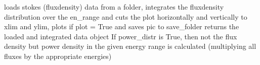 \documentclass[letterpaper,10pt,english]{sphinxmanual}
\begin{document}
\begin{fulllineitems}
\begin{fulllineitems}
\label{\detokenize{API:wavepy.extract_plot_results.ExtractAndPlot.load_plot_stokes_distrib}}
\pysigstartsignatures
{}
\pysigstopsignatures
\sphinxAtStartPar
loads stokes (flux\sphinxhyphen{}density) data from a folder, integrates the flux\sphinxhyphen{}density distribution over the en\_range
and cuts the plot horizontally and vertically to xlim and ylim, plots if plot = True and saves pic to save\_folder
returns the loaded and integrated data object
If power\_distr is True, then not the flux density but power density in the given energy
range is calculated (multiplying all fluxes by the appropriate energies)

\end{fulllineitems}


\end{fulllineitems}




\renewcommand{\indexname}{Index}
\printindex
\end{document}
